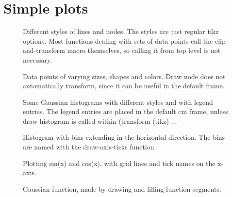 \documentclass{article}
\begin{document}
\section{Simple plots}
\begin{figure}[H]
\centering

\caption{Different styles of lines and nodes. The styles are just regular tikz options. Most functions 
dealing with sets of data points call the clip-and-transform macro themselves, so calling it from 
top level is not necessary.}
\end{figure}
\begin{figure}[H]
\centering

\caption{Data points of varying sizes, shapes and colors. Draw node does not automatically transform, 
since it can be useful in the default frame.}
\end{figure}
\begin{figure}[H]
\centering

\caption{Some Gaussian histograms with different styles and with legend entries. 
The legend entries are placed in the default cm frame, unless draw-histogram 
is called within (transform (tikz) ...}
\end{figure}
\begin{figure}[H]
\centering

\caption{Histogram with bins extending in the horizontal direction. 
The bins are named with the draw-axis-ticks function.}
\end{figure}
\begin{figure}[H]
\centering

\caption{Plotting sin(x) and cos(x), with grid lines and tick names on the x-axis.}
\end{figure}
\begin{figure}[H]
\centering

\caption{Gaussian function, made by drawing and filling function segments.}
\end{figure}
\end{document}
